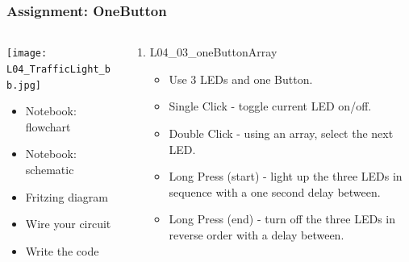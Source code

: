 \documentclass{beamer}
\begin{document}
\begin{frame}\frametitle{Assignment: OneButton}
\begin{columns}
\begin{column}{4.5cm}

\begin{center}
\texttt{[image: L04\_TrafficLight\_bb.jpg]}
\end{center}

\begin{itemize}
\item Notebook: flowchart
\item Notebook: schematic
\item Fritzing diagram
\item Wire your circuit
\item Write the code
\end{itemize}
\end{column}
\begin{column}{6.5cm}
\begin{enumerate}
\item L04\_03\_oneButtonArray
	\begin{itemize}
		\item Use 3 LEDs and one Button.
		\item Single Click - toggle current LED on/off.
		\item Double Click - using an array, select the next LED.
		\item Long Press (start) - light up the three LEDs in sequence with a one second delay between.
		\item Long Press (end) - turn off the three LEDs in reverse order with a delay between.
	\end{itemize}
\end{enumerate}
\end{column}
\end{columns}
\end{frame}

\end{document}
